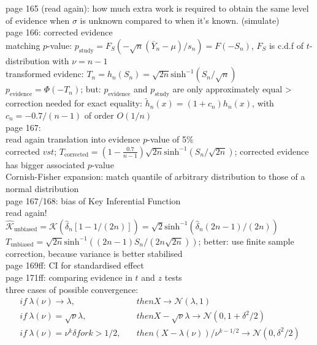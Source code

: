 page 165 (read again): how much extra work is required to obtain the same level of evidence when $\sigma$ is unknown compared to when it's known. (simulate)\\

page 166: corrected evidence\\
matching $p$-value: $p_\text{study} = F_S(-\sqrt{n}(\bar{Y}_n-\mu)/s_n)=F(-S_n)$, $F_S$ is c.d.f of $t$-distribution with $\nu = n-1$\\
transformed evidenc: $T_n = h_n(S_n) = \sqrt{2n}\text{sinh}^{-1}(S_n/\sqrt{n})$\\
$p_{\text{evidence}}=\Phi(-T_n)$; but: $p_{\text{evidence}}$ and $p_{\text{study}}$ are only approximately equal > correction needed for exact equality: $\tilde{h}_n(x)=(1+c_n)h_n(x)$, with $c_n = -0.7/(n-1)$ of order $O(1/n)$\\
page 167:\\
read again translation into evidence $p$-value of 5\%\\
corrected $vst$; $T_{\text{corrected}}=(1-\frac{0.7}{n-1})\sqrt{2n}\text{sinh}^{-1}(S_n/\sqrt{2n})$; corrected evidence has bigger associated $p$-value\\
Cornish-Fisher expansion: match quantile of arbitrary distribution to those of a normal distribution\\

page 167/168: bias of Key Inferential Function\\
read again!\\
$\hat{\mathcal{K}}_{\text{unbiased}}=\mathcal{K}(\hat{\delta}_n[1-1/(2n)])=\sqrt{2}\text{sinh}^{-1}(\hat{\delta}_n(2n-1)/(2n))$\\
$T_{\text{unbiased}}=\sqrt{2n}\text{sinh}^{-1}((2n-1)S_n/(2n\sqrt{2n}))$; better: use finite sample correction, because variance is better stabilised\\

page 169ff: CI for standardised effect\\

page 171ff: comparing evidence in $t$ and $z$ tests\\
three cases of possible convergence: 
\begin{align*}
    if\: \lambda(\nu) \rightarrow \lambda, \quad &then X \rightarrow \mathcal{N}(\lambda,1)\\
    if\: \lambda(\nu) = \sqrt{\nu}\lambda, \quad &then X-\sqrt{\nu}\lambda \rightarrow \mathcal{N}(0,1+\delta^2/2)\\
    if\: \lambda(\nu) = \nu^k \delta for k > 1/2, \quad &then (X-\lambda(\nu))/\nu^{k-1/2} \rightarrow \mathcal{N}(0,\delta^2/2)\\
\end{align*}

